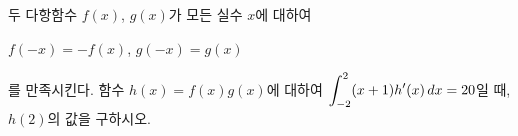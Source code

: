 두 다항함수 $f(x)$, $g(x)$가 모든 실수 $x$에 대하여 \par\smallskip\noindent\hspace*{1.5em}$f(-x)=-f(x)$, $g(-x)=g(x)$\par\smallskip\noindent 를 만족시킨다. 함수 $h(x)=f(x)g(x)$에 대하여 $\displaystyle\int_{-2}^{2} (x+1)h'(x)\mkern3mu dx=20$일 때, $h(2)$의 값을 구하시오.
